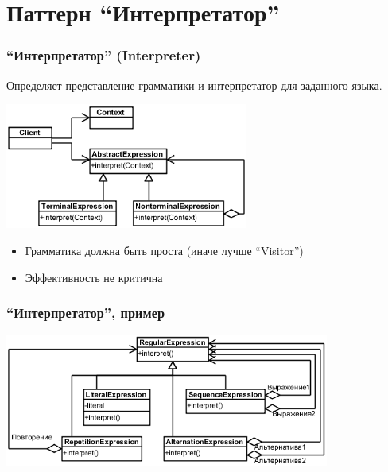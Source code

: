 \documentclass{../../slides-style}
\begin{document}
    \section{Паттерн ``Интерпретатор''}

    \begin{frame}
        \frametitle{``Интерпретатор'' (Interpreter)}
        Определяет представление грамматики и интерпретатор для заданного языка.
        \begin{center}
            \includegraphics[width=0.6\textwidth]{interpreter.png}
        \end{center}
        \begin{itemize}
            \item Грамматика должна быть проста (иначе лучше ``Visitor'')
            \item Эффективность не критична
        \end{itemize}
    \end{frame}

    \begin{frame}
        \frametitle{``Интерпретатор'', пример}
        \begin{center}
            \includegraphics[width=0.8\textwidth]{regexp.png}
        \end{center}
    \end{frame}
\end{document}
